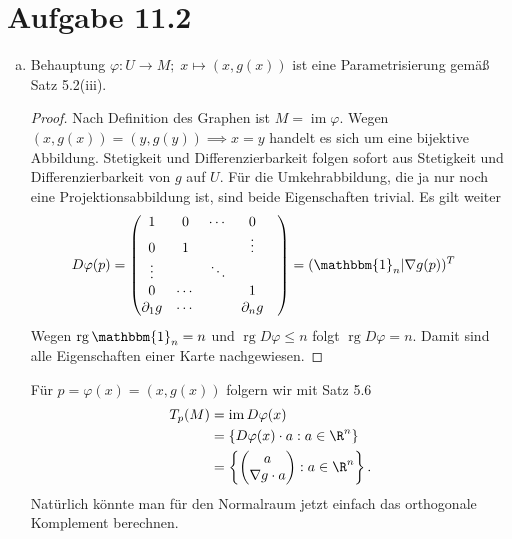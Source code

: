 \documentclass{article}
\begin{document}
\section*{Aufgabe 11.2}
    \begin{enumerate}[(a)]
        \item Behauptung $\varphi \colon U \to M;\; x \mapsto (x, g(x))$ ist eine Parametrisierung gemäß Satz 5.2(iii).
        \begin{proof}
            Nach Definition des Graphen ist $M = \operatorname{im}\varphi$. Wegen $(x, g(x)) = (y, g(y)) \implies x = y$
            handelt es sich um eine bijektive Abbildung. Stetigkeit und Differenzierbarkeit folgen sofort aus Stetigkeit
            und Differenzierbarkeit von $g$ auf $U$. Für die Umkehrabbildung, die ja nur noch eine Projektionsabbildung ist,
            sind beide Eigenschaften trivial. Es gilt weiter
            \begin{align*}
                D\varphi(p) &= \begin{pmatrix}
                    1 & 0 & \cdots & 0\\
                    0 & 1 & & \vdots\\
                    \vdots & & \ddots & &\\
                    0 & \cdots & & 1\\
                    \partial_1 g & \cdots & & \partial_n g
                \end{pmatrix} = (\mathbbm{1}_n | \nabla g(p))^T
            \end{align*}
            Wegen $\operatorname{rg} \mathbbm{1}_n = n$ und $\operatorname{rg} D\varphi \leq n$ folgt 
            $\operatorname{rg} D\varphi = n$.
            Damit sind alle Eigenschaften einer Karte nachgewiesen.
        \end{proof}
        Für $p = \varphi(x) = (x, g(x))$ folgern wir mit Satz 5.6
        \begin{align*}
            T_p(M) &= \operatorname{im} D\varphi(x)\\
            &= \left\{D\varphi(x) \cdot a: a \in \R^n\right\}\\
            &= \left\{\begin{pmatrix}
                a\\
                \nabla g \cdot a
            \end{pmatrix}: a \in \R^n\right\}.
        \end{align*}
        Natürlich könnte man für den Normalraum jetzt einfach das orthogonale Komplement berechnen.

\end{enumerate}
\end{document}
